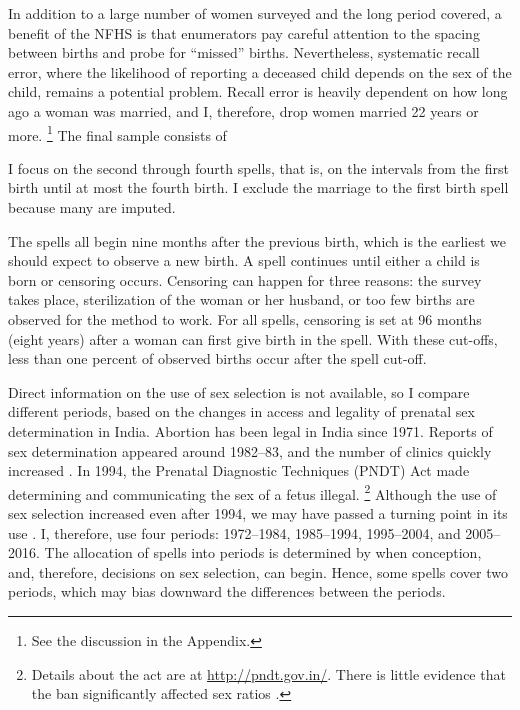 \documentclass[12pt,letterpaper]{article}
\begin{document}
In addition to a large number of women surveyed and the long period covered, a
benefit of the NFHS is that enumerators pay careful attention to the spacing 
between births and probe for ``missed'' births.
Nevertheless, systematic recall error, where the likelihood of reporting a deceased 
child depends on the sex of the child, remains a potential problem.
Recall error is heavily dependent on how long ago a woman was married, and I, therefore, 
drop women married 22 years or more.%
\footnote{
See the discussion in the Appendix.
}
The final sample consists of 



I focus on the second through fourth spells, that is, on the intervals from the first 
birth until at most the fourth birth.
I exclude the marriage to the first birth spell because many are imputed.

The spells all begin nine months after the previous birth, which is the earliest we should 
expect to observe a new birth.
A spell continues until either a child is born or censoring occurs.
Censoring can happen for three reasons:
the survey takes place,
sterilization of the woman or her husband,
or too few births are observed for the method to work.
For all spells, censoring is set at 96 months (eight years) after a woman can first
give birth in the spell.
With these cut-offs, less than one percent of observed births occur after
the spell cut-off.

% 

Direct information on the use of sex selection is not available, so I compare different 
periods, based on the changes in access and legality of prenatal sex 
determination in India.
Abortion has been legal in India since 1971.
Reports of sex determination appeared around 1982--83, and the number of clinics 
quickly increased \citep{Sudha1999,bhat06,Grover2006}.
In 1994, the Prenatal Diagnostic Techniques (PNDT) Act made determining and communicating 
the sex of a fetus illegal.%
\footnote{
Details about the act are at \href{http://pndt.gov.in/}{http://pndt.gov.in/}.
There is little evidence that the ban significantly affected sex ratios \citep{Das-Gupta2016}.
}
Although the use of sex selection increased even after 1994, we may have passed a 
turning point in its use \citep{Das_Gupta2009,Diamond-Smith2015}.
I, therefore, use four periods: 1972--1984, 1985--1994, 1995--2004, and 2005--2016.
The allocation of spells into periods is determined by when conception, and, therefore, 
decisions on sex selection, can begin. 
Hence, some spells cover two periods, which may bias downward the differences between the 
periods.
\end{document}
